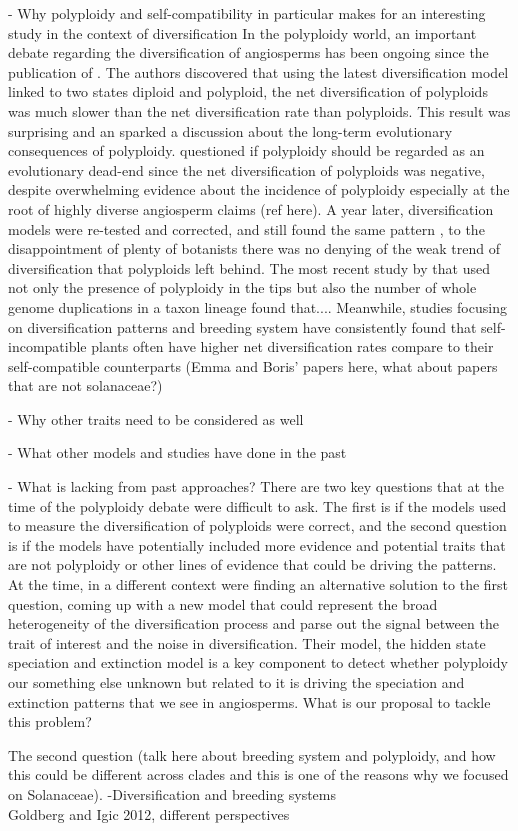 - Why polyploidy and self-compatibility in particular makes for an  interesting study in the context of diversification\newline
In the polyploidy world, an important debate regarding the diversification of angiosperms has been ongoing since the publication of \citet{mayrose_2011}. The authors discovered that using the latest diversification model linked to two states diploid and polyploid, the net diversification of polyploids was much slower than the net diversification rate than polyploids. This result was surprising and an sparked a discussion about the long-term evolutionary consequences of polyploidy. \citet{soltis_2014} questioned if polyploidy should be regarded as an evolutionary dead-end since the net diversification of polyploids was negative, despite overwhelming evidence about the incidence of polyploidy  especially at the root of highly diverse angiosperm claims (ref here). A year later, diversification models were re-tested and corrected, and still found the same pattern \citep{mayrose_2015}, to the disappointment of plenty of botanists there was no denying of the weak trend of diversification that polyploids left behind. The most recent study by \citet{landis_2018} that used not only the presence of polyploidy in the tips but also the number of whole genome duplications in a taxon lineage found that.... \newline  Meanwhile, studies focusing on diversification patterns and  breeding system have consistently found that self-incompatible plants often have higher net diversification rates compare to their self-compatible counterparts (Emma and Boris' papers here, what about papers that are not solanaceae?) 

- Why other traits need to be considered as well\newline


- What other models and studies have done in the past\newline

- What is lacking from past approaches? \newline
There are two key questions that at the time of the polyploidy debate were difficult to ask. The first is if the models used to measure the diversification of polyploids were correct, and the second question is if the models have potentially included more evidence and potential traits that are not polyploidy or other lines of evidence that could be driving the patterns. At the time, in a different context \citet{beaulieu_2016} were finding an alternative solution to the first question, coming up with a new model that could represent the broad heterogeneity of the diversification process and parse out the signal between the trait of interest and the noise in diversification. Their model, the hidden state speciation and extinction model is a key component to detect whether polyploidy our something else unknown but related to it is driving the speciation and extinction patterns that we see in angiosperms. \newline
What is our proposal to tackle this problem?\newline

The second question (talk here about breeding system and polyploidy, and how this could be different across clades and this is one of the reasons why we focused on Solanaceae).
-Diversification and breeding systems\\
Goldberg and Igic 2012, different  perspectives\\

